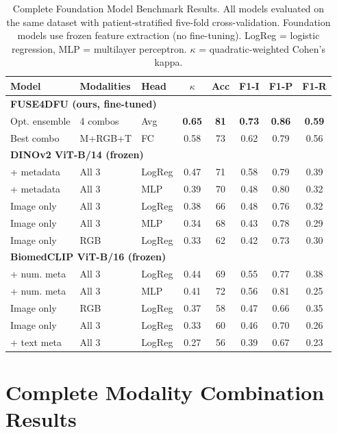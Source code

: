 \documentclass[journal,twoside,web]{ieeecolor}
\begin{document}
\begin{table}[H]
\renewcommand{\arraystretch}{1.15}
\caption{Complete Foundation Model Benchmark Results. All models evaluated on the same dataset with patient-stratified five-fold cross-validation. Foundation models use frozen feature extraction (no fine-tuning). LogReg = logistic regression, MLP = multilayer perceptron. $\kappa$ = quadratic-weighted Cohen's kappa.}
\label{tab:foundation_full}
\centering
\footnotesize
\begin{tabular}{|l|l|l|c|c|c|c|c|}
\hline
\textbf{Model} & \textbf{Modalities} & \textbf{Head} & \textbf{$\kappa$} & \textbf{Acc} & \textbf{F1-I} & \textbf{F1-P} & \textbf{F1-R} \\
\hline
\multicolumn{8}{|l|}{\textbf{FUSE4DFU (ours, fine-tuned)}} \\
\hline
Opt. ensemble & 4 combos & Avg & \textbf{0.65} & \textbf{81} & \textbf{0.73} & \textbf{0.86} & \textbf{0.59} \\
Best combo & M+RGB+T & FC & 0.58 & 73 & 0.62 & 0.79 & 0.56 \\
\hline
\multicolumn{8}{|l|}{\textbf{DINOv2 ViT-B/14 (frozen)}} \\
\hline
+ metadata & All 3 & LogReg & 0.47 & 71 & 0.58 & 0.79 & 0.39 \\
+ metadata & All 3 & MLP & 0.39 & 70 & 0.48 & 0.80 & 0.32 \\
Image only & All 3 & LogReg & 0.38 & 66 & 0.48 & 0.76 & 0.32 \\
Image only & All 3 & MLP & 0.34 & 68 & 0.43 & 0.78 & 0.29 \\
Image only & RGB & LogReg & 0.33 & 62 & 0.42 & 0.73 & 0.30 \\
\hline
\multicolumn{8}{|l|}{\textbf{BiomedCLIP ViT-B/16 (frozen)}} \\
\hline
+ num. meta & All 3 & LogReg & 0.44 & 69 & 0.55 & 0.77 & 0.38 \\
+ num. meta & All 3 & MLP & 0.41 & 72 & 0.56 & 0.81 & 0.25 \\
Image only & RGB & LogReg & 0.37 & 58 & 0.47 & 0.66 & 0.35 \\
Image only & All 3 & LogReg & 0.33 & 60 & 0.46 & 0.70 & 0.26 \\
+ text meta & All 3 & LogReg & 0.27 & 56 & 0.39 & 0.67 & 0.23 \\
\hline
\end{tabular}
\end{table}

\section{Complete Modality Combination Results}
\label{app:all_combos}
\end{document}
